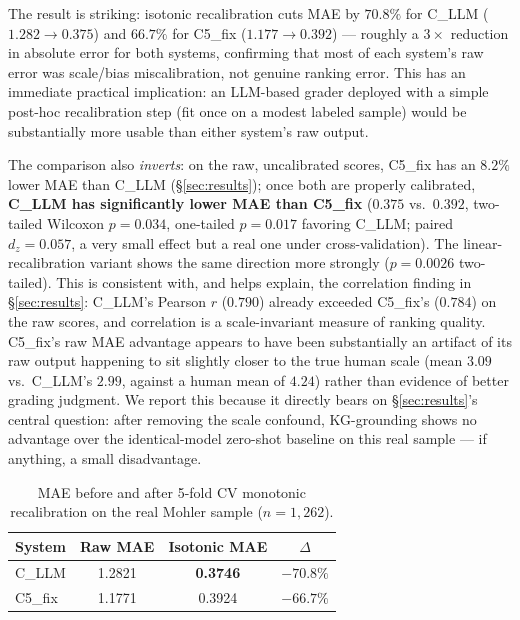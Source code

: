 \documentclass[conference]{IEEEtran}
\begin{document}
The result is striking: isotonic recalibration cuts MAE by
$70.8\%$ for C\_LLM ($1.282 \to 0.375$) and $66.7\%$ for C5\_fix
($1.177 \to 0.392$) --- roughly a $3\times$ reduction in absolute error
for both systems, confirming that most of each system's raw error was
scale/bias miscalibration, not genuine ranking error. This has an
immediate practical implication: an LLM-based grader deployed with a
simple post-hoc recalibration step (fit once on a modest labeled sample)
would be substantially more usable than either system's raw output.

The comparison also \emph{inverts}: on the raw, uncalibrated scores,
C5\_fix has an $8.2\%$ lower MAE than C\_LLM (\S\ref{sec:results}); once
both are properly calibrated, \textbf{C\_LLM has significantly lower MAE
than C5\_fix} ($0.375$ vs.\ $0.392$, two-tailed Wilcoxon $p=0.034$,
one-tailed $p=0.017$ favoring C\_LLM; paired $d_z=0.057$, a very small
effect but a real one under cross-validation). The linear-recalibration
variant shows the same direction more strongly ($p=0.0026$ two-tailed).
This is consistent with, and helps explain, the correlation finding in
\S\ref{sec:results}: C\_LLM's Pearson $r$ ($0.790$) already exceeded
C5\_fix's ($0.784$) on the raw scores, and correlation is a scale-invariant
measure of ranking quality. C5\_fix's raw MAE advantage appears to have
been substantially an artifact of its raw output happening to sit
slightly closer to the true human scale (mean $3.09$ vs.\ C\_LLM's
$2.99$, against a human mean of $4.24$) rather than evidence of better
grading judgment. We report this because it directly bears on
\S\ref{sec:results}'s central question: after removing the scale
confound, KG-grounding shows no advantage over the identical-model
zero-shot baseline on this real sample --- if anything, a small
disadvantage.

\begin{table}[t]
\caption{MAE before and after 5-fold CV monotonic recalibration on the
real Mohler sample ($n=1{,}262$).}
\label{tab:calibration}
\centering
\begin{tabular}{lccc}
\toprule
\textbf{System} & \textbf{Raw MAE} & \textbf{Isotonic MAE} & \textbf{$\Delta$} \\
\midrule
C\_LLM  & 1.2821 & \textbf{0.3746} & $-70.8\%$ \\
C5\_fix & 1.1771 & 0.3924 & $-66.7\%$ \\
\bottomrule
\end{tabular}
\end{table}
\end{document}
